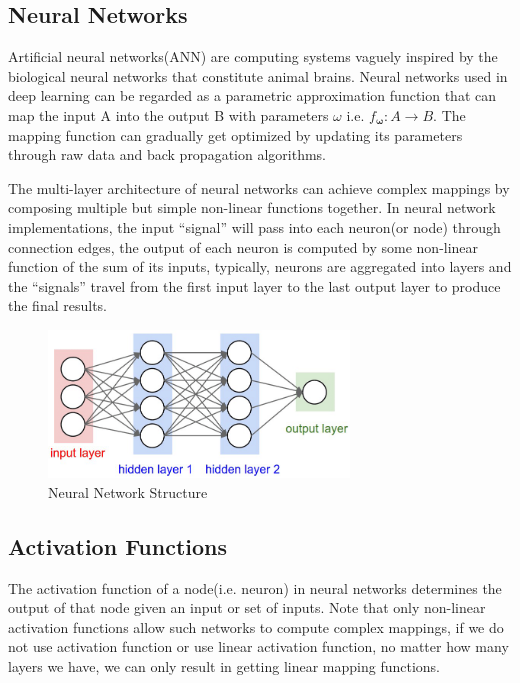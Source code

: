 \subsection{Neural Networks}
Artificial neural networks(ANN) are computing systems vaguely inspired by 
the biological neural networks that constitute animal brains\cite{wikipedia}. Neural networks used in deep learning 
can be regarded as a parametric approximation function that can map the input A into the output
B with parameters $\omega$ i.e. $f_{\boldsymbol{\omega}}: A \rightarrow B$. The mapping 
function can gradually get optimized by updating its parameters through raw data and 
back propagation algorithms. 

The multi-layer architecture of neural networks can achieve complex mappings by composing 
multiple but simple non-linear functions together.
In neural network implementations, the input “signal” will pass into each neuron(or node) through
connection edges, the output of each neuron is computed by some non-linear function of 
the sum of its inputs, typically, neurons are aggregated into layers and the “signals”
travel from the first input layer to the last output layer to produce the final results.
\begin{figure}[H]
    \begin{center}
    \includegraphics[width=8cm]{figures/nn-structure}
    \end{center}
    \caption{Neural Network Structure}
    \label{fig:neural-network-structure}
\end{figure}

\subsection{Activation Functions}
The activation function of a node(i.e. neuron) in neural networks determines the output of that node 
given an input or set of inputs. Note that only non-linear activation functions allow such networks 
to compute complex mappings, if we do not use activation function or use linear activation function,
no matter how many layers we have, we can only result in getting linear mapping functions.

